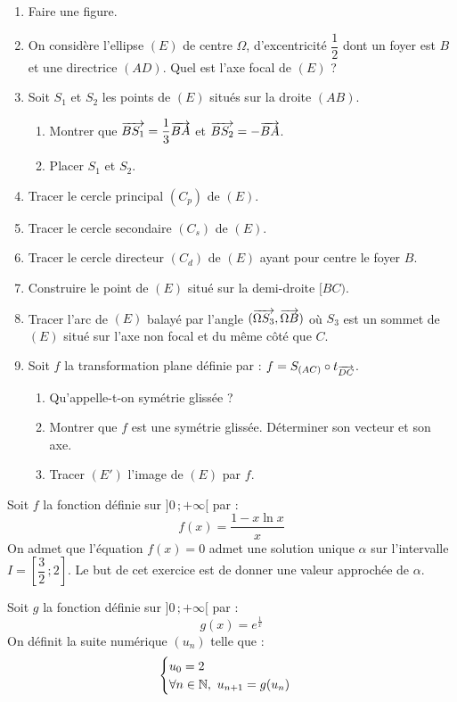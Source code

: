 \documentclass[11pt]{article}
\begin{document}
\begin{enumerate}
  \item Faire une figure.
  \item On considère l'ellipse $(E)$ de centre $\Omega$, d'excentricité $\dfrac{1}{2}$ dont un foyer est $B$ et une directrice $(AD)$. Quel est l'axe focal de $(E)$ ?
  \item Soit $S_1$ et $S_2$ les points de $(E)$ situés sur la droite $(AB)$.
  \begin{enumerate}[label=\alph*.]
    \item Montrer que $\overrightarrow{BS_1} = \dfrac{1}{3}\overrightarrow{BA}$ et $\overrightarrow{BS_2} = -\overrightarrow{BA}$.
    \item Placer $S_1$ et $S_2$.
  \end{enumerate}
  \item Tracer le cercle principal $(C_p)$ de $(E)$.
  \item Tracer le cercle secondaire $(C_s)$ de $(E)$.
  \item Tracer le cercle directeur $(C_d)$ de $(E)$ ayant pour centre le foyer $B$.
  \item Construire le point de $(E)$ situé sur la demi-droite $[BC)$.
  \item Tracer l'arc de $(E)$ balayé par l'angle $(\overrightarrow{\Omega S_3},\overrightarrow{\Omega B})$ où $S_3$ est un sommet de $(E)$ situé sur l'axe non focal et du même côté que $C$.
  \item Soit $f$ la transformation plane définie par : $f = S_{(AC)} \circ t_{\overrightarrow{DC}}$.
  \begin{enumerate}[label=\alph*.]
    \item Qu'appelle-t-on symétrie glissée ?
    \item Montrer que $f$ est une symétrie glissée. Déterminer son vecteur et son axe.
    \item Tracer $(E')$ l'image de $(E)$ par $f$.
  \end{enumerate}
\end{enumerate}


Soit $f$ la fonction définie sur $]0\,;+\infty[$ par :
\[ f(x) = \frac{1 - x\ln x}{x} \]
On admet que l'équation $f(x) = 0$ admet une solution unique $\alpha$ sur l'intervalle $I = \left[\dfrac{3}{2}\,;2\right]$. Le but de cet exercice est de donner une valeur approchée de $\alpha$.

Soit $g$ la fonction définie sur $]0\,;+\infty[$ par :
\[ g(x) = e^{\frac{1}{x}} \]
On définit la suite numérique $(u_n)$ telle que :
\[ \begin{cases} u_0 = 2 \\ \forall n \in \mathbb{N},\ u_{n+1} = g(u_n) \end{cases} \]
\end{document}
